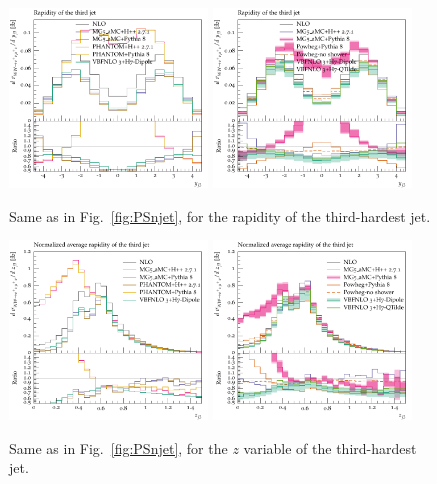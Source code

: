 \begin{figure}[hbt]
\centering
\includegraphics[width=0.47\textwidth]{figures/LOPS/y_j3.pdf}
\includegraphics[width=0.47\textwidth]{figures/NLOPS/y_j3.pdf}
\caption{Same as in Fig.~\protect\ref{fig:PSnjet}, for the rapidity of the third-hardest jet.}
\label{fig:PSy3}
\end{figure}
 
\begin{figure}[hbt]
\centering
\includegraphics[width=0.47\textwidth]{figures/LOPS/z_j3.pdf}
\includegraphics[width=0.47\textwidth]{figures/NLOPS/z_j3.pdf}
\caption{Same as in Fig.~\protect\ref{fig:PSnjet}, for the $z$ variable of the third-hardest jet.}
\label{fig:PSz3}
\end{figure}
